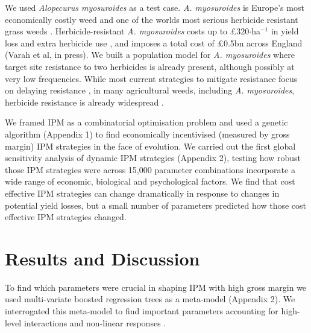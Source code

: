 \documentclass[12pt, a4paper]{article}
\begin{document}
We used \textit{Alopecurus myosuroides} as a test case. \textit{A. myosuroides} is Europe's most economically costly weed \citep{Moss2007} and one of the worlds most serious herbicide resistant grass weeds \citep{Heap2014}. Herbicide-resistant \textit{A. myosuroides} costs up to \pounds 320$\cdot$ha$^{-1}$ in yield loss and extra herbicide use \citep{Hick2018}, and imposes a total cost of \pounds 0.5bn across England (Varah et al, in press). We built a population model for \textit{A. myosuroides} where target site resistance to two herbicides is already present, although possibly at very low frequencies. While most current strategies to mitigate resistance focus on delaying resistance \citep{REX2013}, in many agricultural weeds, including \textit{A. myosuroides}, herbicide resistance is already widespread \citep{Hick2018}.            

We framed IPM as a combinatorial optimisation problem and used a genetic algorithm (Appendix 1) to find economically incentivised (measured by gross margin) IPM strategies \citep{Tayl2004GA, Carr2010} in the face of evolution. We carried out the first global sensitivity analysis of dynamic IPM strategies (Appendix 2), testing how robust those IPM strategies were across 15,000 parameter combinations incorporate a wide range of economic, biological and psychological factors. We find that cost effective IPM strategies can change dramatically in response to changes in potential yield losses, but a small number of parameters predicted how those cost effective IPM strategies changed. 

\section*{Results and Discussion}
To find which parameters were crucial in shaping IPM with high gross margin we used multi-variate boosted regression trees \citep{Mill2016} as a meta-model \citep{Cout2013}(Appendix 2). We interrogated this meta-model to find important parameters accounting for high-level interactions and non-linear responses \citep{Frie2001, Mill2016}.
\end{document}
